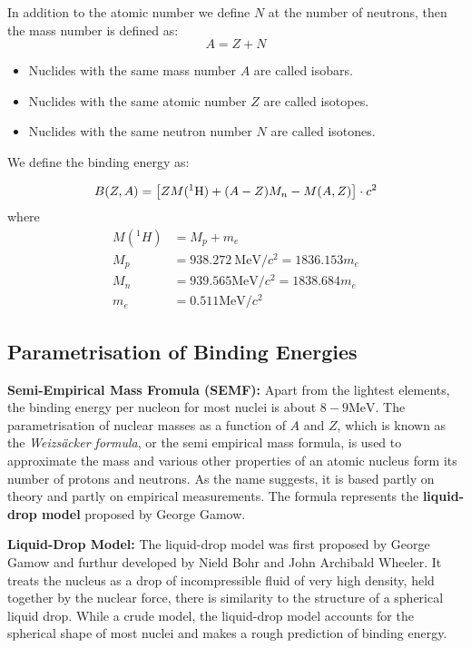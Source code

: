 \documentclass[10pt,a4paper]{article}
\newcounter{theo}
\newcommand{\mev}{\text{MeV}}
\begin{document}
In addition to the atomic number we define $N$ at the number of neutrons, then the mass number is defined as:
\begin{equation}
    A = Z+N
\end{equation}
\begin{itemize}
    \item Nuclides with the same mass number $A$ are called isobars.
    \item Nuclides with the same atomic number $Z$ are called isotopes.
    \item Nuclides with the same neutron number $N$ are called isotones.
\end{itemize}

We define the binding energy as:

\begin{equation}
    B(Z,A) = \left[ZM(^1\text H) + (A -Z)M_n - M(A, Z)\right]\cdot c^2
\end{equation}
where 
\begin{align*}
    M(^1H) &= M_p + m_e \\
    M_p &= 938.272 \ \mev/c^2 = 1836.153 m_e\\
    M_n &= 939.565\mev/c^2 = 1838.684 m_e \\
    m_e &= 0.511\mev/c^2
\end{align*}

\subsection{Parametrisation of Binding Energies}
\textbf{Semi-Empirical Mass Fromula (SEMF):} Apart from the lightest elements, the binding energy per nucleon for most nuclei is about $8-9\mev$. The parametrisation of nuclear masses as a function of $A$ and $Z$, which is known as the \textit{Weizsäcker formula}, or the semi empirical mass formula, is used to approximate the mass and various other properties of an atomic nucleus form its number of protons and neutrons. As the name suggests, it is based partly on theory and partly on empirical measurements. The formula represents the \textbf{liquid-drop model} proposed by George Gamow.

\textbf{Liquid-Drop Model:} The liquid-drop model was first proposed by George Gamow and furthur developed by Nield Bohr and John Archibald Wheeler. It treats the nucleus as a drop of incompressible fluid of very high density, held together by the nuclear force, there is similarity to the structure of a spherical liquid drop. While a crude model, the liquid-drop model accounts for the spherical shape of most nuclei and makes a rough prediction of binding energy.
\end{document}
